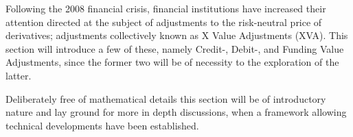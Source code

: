 \documentclass[main.tex]{subfiles}
\begin{document}
    Following the 2008 financial crisis,
    financial institutions have increased their attention directed at the subject of 
    adjustments to the risk-neutral price of derivatives;
    adjustments collectively known as X Value Adjustments (XVA).
    This section will introduce a few of these, 
    namely Credit-, Debit-, and Funding Value Adjustments,
    since the former two will be of necessity to the exploration of the latter.

    Deliberately free of mathematical details this section will be of introductory nature 
    and lay ground for more in depth discussions, 
    when a framework allowing technical developments have been established.
\end{document}

